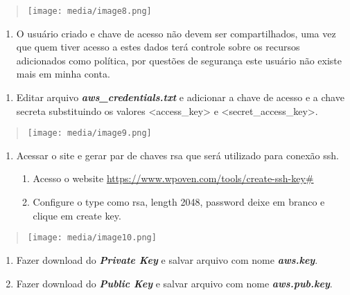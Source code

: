 \begin{quote}
\texttt{[image: media/image8.png]}
\end{quote}

\begin{enumerate}
\def\labelenumi{\arabic{enumi}.}
\setcounter{enumi}{7}
\item
  O usuário criado e chave de acesso não devem ser compartilhados, uma
  vez que quem tiver acesso a estes dados terá controle sobre os
  recursos adicionados como política, por questões de segurança este
  usuário não existe mais em minha conta.
\end{enumerate}

\begin{enumerate}
\def\labelenumi{\arabic{enumi}.}
\setcounter{enumi}{3}
\item
  Editar arquivo \emph{\textbf{aws\_credentials.txt}} e adicionar a
  chave de acesso e a chave secreta substituindo os valores
  \textless access\_key\textgreater{} e
  \textless secret\_access\_key\textgreater.
\end{enumerate}

\begin{quote}
\texttt{[image: media/image9.png]}
\end{quote}

\begin{enumerate}
\def\labelenumi{\arabic{enumi}.}
\setcounter{enumi}{4}
\item
  Acessar o site e gerar par de chaves rsa que será utilizado para
  conexão ssh.

  \begin{enumerate}
  \def\labelenumii{\arabic{enumii}.}
  \item
    Acesso o website
    \href{https://www.wpoven.com/tools/create-ssh-key}{https://www.wpoven.com/tools/create-ssh-key\#}
  \item
    Configure o type como rsa, length 2048, password deixe em branco e
    clique em create key.
  \end{enumerate}
\end{enumerate}

\begin{quote}
\texttt{[image: media/image10.png]}
\end{quote}

\begin{enumerate}
\def\labelenumi{\arabic{enumi}.}
\setcounter{enumi}{2}
\item
  Fazer download do \emph{\textbf{Private Key}} e salvar arquivo com
  nome \emph{\textbf{aws.key}}.
\item
  Fazer download do \emph{\textbf{Public Key}} e salvar arquivo com nome
  \emph{\textbf{aws.pub.key}}.
\end{enumerate}

